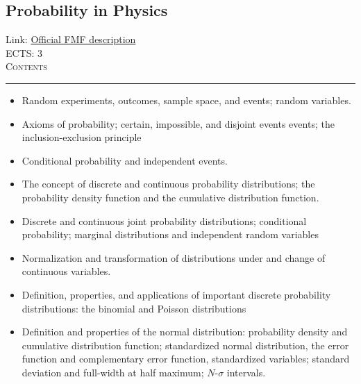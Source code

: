 \documentclass[11pt, a4paper]{article}
\newenvironment{course}[3]{
\subsection{#1}%
Link: \href{#2}{Official FMF description}\\%
ECTS: #3%
\vspace{1ex}
\\
{\large \textsc{Contents}}\\[-0.9ex]%
\rule{\textwidth}{0.5pt}
\vspace{-3ex}
}
{}
\newenvironment{chapter}[1]{
\begin{tcolorbox}[title=#1, breakable]
}
{\end{tcolorbox}}
\begin{document}
\begin{course}{Probability in Physics}{https://www.fmf.uni-lj.si/en/study-physics/programmes/1fiz/2020/7000777/courses/1177/}{3}
    \label{probability_in_physics}

    \begin{chapter}{Fundamentals of frequentist probability}
        \begin{itemize}
        
            \item Random experiments, outcomes, sample space, and events; random variables.

            \item Axioms of probability; certain, impossible, and disjoint events events; the inclusion-exclusion principle

            \item Conditional probability and independent events.
        
        \end{itemize}
    \end{chapter}

    \begin{chapter}{Probability distributions}

        \begin{itemize}
        
            \item The concept of discrete and continuous probability distributions; the probability density function and the cumulative distribution function.

            \item Discrete and continuous joint probability distributions; conditional probability; marginal distributions and independent random variables

            \item Normalization and transformation of distributions under and change of continuous variables.

            \item Definition, properties, and applications of important discrete probability distributions: the binomial and Poisson distributions

            \item Definition and properties of the normal distribution: probability density and cumulative distribution function; standardized normal distribution, the error function and complementary error function, standardized variables; standard deviation and full-width at half maximum; $ N $-$ \sigma $ intervals.


\end{itemize}
\end{chapter}
\end{course}
\end{document}
